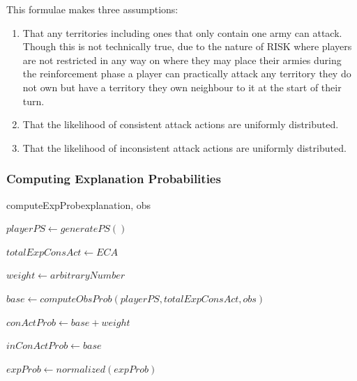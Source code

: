 \documentclass[parskip]{cs4rep}
\begin{document}
This formulae makes three assumptions:

\begin{enumerate}
\item
That any territories including ones that only contain one army can attack. Though this is not technically true, due to the nature of RISK where players are not restricted in any way on where they may place their armies during the reinforcement phase a player can practically attack any territory they do not own but have a territory they own neighbour to it at the start of their turn.
\item
That the likelihood of consistent attack actions are uniformly distributed.
\item
That the likelihood of inconsistent attack actions are uniformly distributed.
\end{enumerate}

\subsubsection{Computing Explanation Probabilities}

\begin{pseudocode}[ruled]{computeExpProb}{explanation, obs}
\begin{algorithm}[H]


$playerPS \gets generatePS()$

$totalExpConsAct \gets ECA$

$weight \gets arbitraryNumber$ \newline

$base \gets computeObsProb(playerPS, totalExpConsAct, obs)$ 

$conActProb \gets base + weight$

$inConActProb \gets base$ \newline


$expProb \gets normalized(expProb)$

\end{algorithm}
\end{pseudocode}
\end{document}
